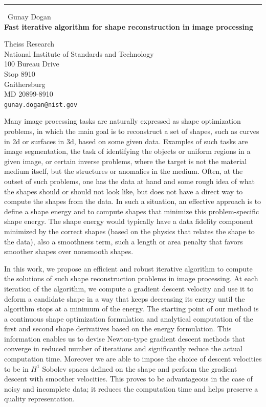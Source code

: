 \documentclass{report}
\begin{document}
\begin{center}
\rule{6in}{1pt} \
{\large Gunay Dogan \\
{\bf Fast iterative algorithm for shape reconstruction in image processing}}

Theiss Research \\ National Institute of Standards and Technology \\ 100 Bureau Drive \\ Stop 8910 \\ Gaithersburg \\ MD 20899-8910
\\
{\tt gunay.dogan@nist.gov}\end{center}

Many image processing tasks are naturally expressed as shape optimization
problems, in which the main goal is to reconstruct a set of shapes, such
as curves in 2d or surfaces in 3d, based on some given data. Examples of
such tasks are image segmentation, the task of identifying the objects or
uniform regions in a given image, or certain inverse problems, where the
target is not the material medium itself, but the structures or anomalies
in the medium. Often, at the outset of such problems, one has the data at
hand and some rough idea of what the shapes should or should not look
like, but does not have a direct way to compute the shapes from the data.
In such a situation, an effective approach is to define a shape energy
and to compute shapes that minimize this problem-specific shape energy.
The shape energy would typically have a data fidelity component minimized
by the correct shapes (based on the physics that relates the shape to the
data), also a smoothness term, such a length or area penalty that favors
smoother shapes over nonsmooth shapes.

In this work, we propose an efficient and robust iterative algorithm to
compute the solutions of such shape reconstruction problems in image
processing. At each iteration of the algorithm, we compute a gradient
descent velocity and use it to deform a candidate shape in a way that
keeps decreasing its energy until the algorithm stops at a minimum of the
energy. The starting point of our method is a continuous shape
optimization formulation and analytical computation of the first and
second shape derivatives based on the energy formulation. This
information enables us to devise Newton-type gradient descent methods
that converge in reduced number of iterations and significantly reduce
the actual computation time. Moreover we are able to impose the choice of
descent velocities to be in $H^1$ Sobolev spaces defined on the shape and
perform the gradient descent with smoother velocities. This proves to be
advantageous in the case of noisy and incomplete data; it reduces the
computation time and helps preserve a quality representation.
\end{document}
